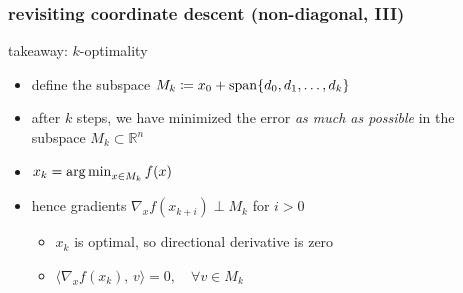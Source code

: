 \documentclass[10pt,dvipsnames*]{beamer}
\begin{document}
%
\begin{frame}
  \frametitle{revisiting coordinate descent (non-diagonal, III)}
  \begin{block}{takeaway: $k$-optimality}
    \begin{itemize}
      \item define the subspace $M_k \coloneqq x_0 + \operatorname{span} \{ d_0, d_1, \ldots, d_{k} \}$
      \item after $k$ steps, we have minimized the error \emph{as much as possible} in the subspace $M_k \subset \mathbb{R}^n$
      \item $x_k = \operatorname*{arg\,min}_{x \in M_k} f(x)$
      \item hence gradients $\nabla_x f(x_{k+i}) \perp M_k$ for $i > 0$
      \begin{itemize}
        \item $x_k$ is optimal, so directional derivative is zero
        \item $\langle \nabla_x f(x_k),\, v \rangle = 0, \quad \forall v \in M_k$
      \end{itemize}
    \end{itemize}
  \end{block}
\end{frame}
%
\end{document}
